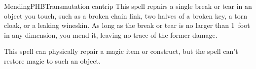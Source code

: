 \begin{spell}{Mending}{PHB}{Transmutation cantrip}
{
}
This spell repairs a single break or tear in an object you
touch, such as a broken chain link, two halves of a broken
key, a torn cloak, or a leaking wineskin. As long as the
break or tear is no larger than 1~foot in any dimension,
you mend it, leaving no trace of the former damage.

This spell can physically repair a magic item or construct,
but the spell can't restore magic to such an object.
\end{spell}